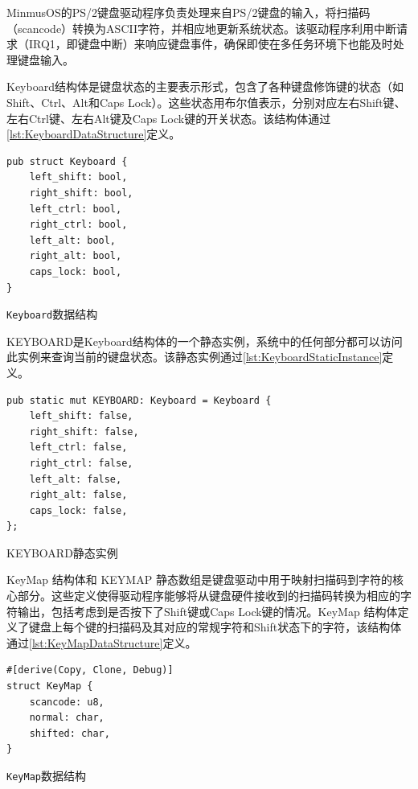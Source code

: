 MinmusOS的PS/2键盘驱动程序负责处理来自PS/2键盘的输入，将扫描码（scancode）转换为ASCII字符，并相应地更新系统状态。该驱动程序利用中断请求（IRQ1，即键盘中断）来响应键盘事件，确保即使在多任务环境下也能及时处理键盘输入。

Keyboard结构体是键盘状态的主要表示形式，包含了各种键盘修饰键的状态（如Shift、Ctrl、Alt和Caps Lock）。这些状态用布尔值表示，分别对应左右Shift键、左右Ctrl键、左右Alt键及Caps Lock键的开关状态。该结构体通过\cref{lst:KeyboardDataStructure}定义。

\begin{listing}[htbp]
    \begin{verbatim}
pub struct Keyboard {
    left_shift: bool,
    right_shift: bool,
    left_ctrl: bool,
    right_ctrl: bool,
    left_alt: bool,
    right_alt: bool,
    caps_lock: bool,
}
    \end{verbatim}
    \caption{\texttt{Keyboard}数据结构}\label{lst:KeyboardDataStructure}
\end{listing}

KEYBOARD是Keyboard结构体的一个静态实例，系统中的任何部分都可以访问此实例来查询当前的键盘状态。该静态实例通过\cref{lst:KeyboardStaticInstance}定义。

\begin{listing}[htbp]
    \begin{verbatim}
pub static mut KEYBOARD: Keyboard = Keyboard {
    left_shift: false,
    right_shift: false,
    left_ctrl: false,
    right_ctrl: false,
    left_alt: false,
    right_alt: false,
    caps_lock: false,
};
    \end{verbatim}
    \caption{KEYBOARD静态实例}\label{lst:KeyboardStaticInstance}
\end{listing}

KeyMap 结构体和 KEYMAP 静态数组是键盘驱动中用于映射扫描码到字符的核心部分。这些定义使得驱动程序能够将从键盘硬件接收到的扫描码转换为相应的字符输出，包括考虑到是否按下了Shift键或Caps Lock键的情况。KeyMap 结构体定义了键盘上每个键的扫描码及其对应的常规字符和Shift状态下的字符，该结构体通过\cref{lst:KeyMapDataStructure}定义。

\begin{listing}[htbp]
    \begin{verbatim}
#[derive(Copy, Clone, Debug)]
struct KeyMap {
    scancode: u8,
    normal: char,
    shifted: char,
}
    \end{verbatim}
    \caption{\texttt{KeyMap}数据结构}\label{lst:KeyMapDataStructure}
\end{listing}

